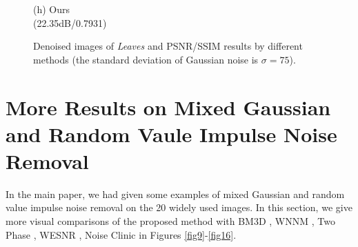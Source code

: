 \documentclass[runningheads]{llncs}
\begin{document}
\begin{figure}
{\begin{minipage}[t]{0.244\textwidth}
{\footnotesize (h) Ours \\(22.35dB/0.7931)}
\end{minipage}
}
\caption{Denoised images of \textsl{Leaves} and PSNR/SSIM results by different methods (the standard deviation of Gaussian noise is $\sigma=75$).}
\label{fig8}
\end{figure}

\section{More Results on Mixed Gaussian and Random Vaule Impulse Noise Removal}
In the main paper, we had given some examples of mixed Gaussian and random value impulse noise removal on the 20 widely used images. In this section, we give more visual comparisons of the proposed method with BM3D \cite{bm3d}, WNNM \cite{wnnm}, Two Phase \cite{cai2010fast}, WESNR \cite{wesnr}, Noise Clinic \cite{noiseclinic} in Figures \ref{fig9}-\ref{fig16}.
\end{document}

